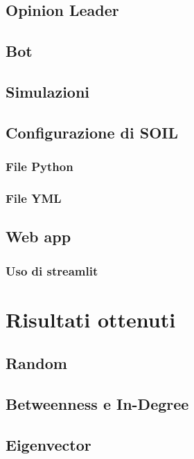 \documentclass[11pt]{article}
\begin{document}
\subsection{Opinion Leader}

\subsection{Bot}

\subsection{Simulazioni}

\subsection{Configurazione di SOIL}

\subsubsection{File Python}

\subsubsection{File YML}

\subsection{Web app}

\subsubsection{Uso di streamlit}

\section{Risultati ottenuti}

\subsection{Random}


\subsection{Betweenness e In-Degree}

\subsection{Eigenvector}
\end{document}
